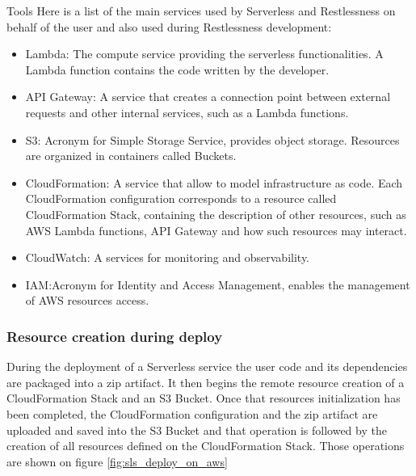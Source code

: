 \begin{chapter}{Tools}
    Here is a list of the main services used by Serverless and Restlessness on
    behalf of the user and also used during Restlessness development:
    \begin{itemize}
        \item Lambda: The compute service providing the serverless functionalities.
            A Lambda function contains the code written by the developer.
        \item API Gateway: A service that creates a connection point between
            external requests and other internal services, such as a Lambda functions.
        \item S3: Acronym for Simple Storage Service, provides object storage.
            Resources are organized in containers called Buckets.
        \item CloudFormation: A service that allow to model infrastructure as code.
            Each CloudFormation configuration corresponds to a resource called
            CloudFormation Stack, containing the description of other resources,
            such as AWS Lambda functions, API Gateway and how such resources may
            interact.
        \item CloudWatch: A services for monitoring and observability.
        \item IAM:Acronym for Identity and Access Management, enables the management
            of AWS resources access.
    \end{itemize}

    \subsubsection{Resource creation during deploy}
    During the deployment of a Serverless service the user code and its dependencies
    are packaged into a zip artifact. It then begins the remote resource creation of
    a CloudFormation Stack and an S3 Bucket. Once that resources initialization has
    been completed, the CloudFormation configuration and the zip artifact are uploaded
    and saved into the S3 Bucket and that operation is followed by the creation of
    all resources defined on the CloudFormation Stack. Those operations are shown
    on figure \ref{fig:sls_deploy_on_aws}


\end{chapter}

